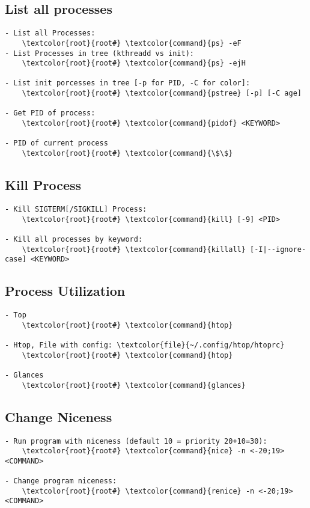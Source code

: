 \documentclass[10pt, a4paper, onecolumn, openany]{book}         %
\begin{document}
\subsection{List all processes}
\begin{Verbatim}[commandchars=\\\{\}]
- List all Processes:
    \textcolor{root}{root#} \textcolor{command}{ps} -eF
- List Processes in tree (kthreadd vs init):
    \textcolor{root}{root#} \textcolor{command}{ps} -ejH

- List init porcesses in tree [-p for PID, -C for color]:
    \textcolor{root}{root#} \textcolor{command}{pstree} [-p] [-C age]
    
- Get PID of process:
    \textcolor{root}{root#} \textcolor{command}{pidof} <KEYWORD>
    
- PID of current process
    \textcolor{root}{root#} \textcolor{command}{\$\$}
\end{Verbatim}

\subsection{Kill Process}
\begin{Verbatim}[commandchars=\\\{\}]
- Kill SIGTERM[/SIGKILL] Process:
    \textcolor{root}{root#} \textcolor{command}{kill} [-9] <PID>

- Kill all processes by keyword:
    \textcolor{root}{root#} \textcolor{command}{killall} [-I|--ignore-case] <KEYWORD>
\end{Verbatim}

\subsection{Process Utilization}
\begin{Verbatim}[commandchars=\\\{\}]
- Top
    \textcolor{root}{root#} \textcolor{command}{htop}

- Htop, File with config: \textcolor{file}{~/.config/htop/htoprc}
    \textcolor{root}{root#} \textcolor{command}{htop}
    
- Glances
    \textcolor{root}{root#} \textcolor{command}{glances}
\end{Verbatim}

\subsection{Change Niceness}
\begin{Verbatim}[commandchars=\\\{\}]
- Run program with niceness (default 10 = priority 20+10=30):
    \textcolor{root}{root#} \textcolor{command}{nice} -n <-20;19> <COMMAND>

- Change program niceness:
    \textcolor{root}{root#} \textcolor{command}{renice} -n <-20;19> <COMMAND>
\end{Verbatim}
\end{document}
